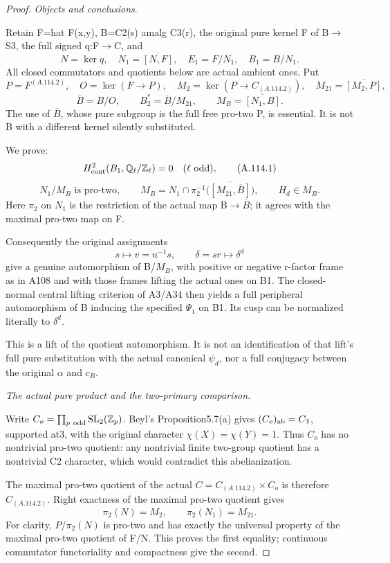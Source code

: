 \begin{proof}
\medskip\noindent\emph{Objects and conclusions}.

Retain F=hat F(x,y), B=C2(s) amalg C3(r), the original pure kernel F of B\(\to\)S3, the full signed q:F\(\to\)C, and
\[
N=\ker q,\quad N_1=\overline{[N,F]},\quad
E_1=F/N_1,\quad B_1=B/N_1.
\]
All closed commutators and quotients below are actual ambient ones. Put
\[
P=F^{(A.114.2)},\quad O=\ker(F\to P),\quad
M_2=\ker(P\to C_{(A.114.2)}),\quad M_{21}=\overline{[M_2,P]},
\]
\[
\overline B=B/O,\qquad B_2^*=\overline B/M_{21},\qquad
M_B=\overline{[N_1,B]}.
\]
The use of \(\overline B\), whose pure subgroup is the full free pro-two P, is essential. It is not B with a different kernel silently substituted.

We prove:
\[
H^2_{\rm cont}(B_1,\mathbb Q_\ell/\mathbb Z_\ell)=0
\quad(\ell\text{ odd}),                                      \tag{A.114.1}
\]
\[
N_1/M_B\text{ is pro-two},\qquad
M_B=N_1\cap\pi_2^{-1}\bigl(\overline{[M_{21},\overline B]}\bigr),
\qquad H_d\in M_B.                                            \tag{A.114.2}
\]
Here \(\pi_2\) on \(N_1\) is the restriction of the actual map B\(\to\)\(\overline B\); it agrees with the maximal pro-two map on F.

Consequently the original assignments
\[
s\mapsto v=u^{-1}s,\qquad \delta=sr\mapsto\delta^d
\]
give a genuine automorphism of B/\(M_B\), with positive or negative r-factor frame as in A108 and with those frames lifting the actual ones on B1. The closed-normal central lifting criterion of A3/A34 then yields a full peripheral automorphism of B inducing the specified \(\Psi_1\) on B1. Its cusp can be normalized literally to \(\delta^d\).

This is a lift of the quotient automorphism. It is not an identification of that lift's full pure substitution with the actual canonical \(\psi_d\), nor a full conjugacy between the original \(\alpha\) and \(c_B\).

\medskip\noindent\emph{The actual pure product and the two-primary comparison}.

Write \(C_o=\prod_{p\ {\rm odd}}\operatorname{SL}_2(\mathbb Z_p)\).
Beyl's Proposition5.7(a) gives \((C_o)_{\rm ab}=C_3\), supported at3, with the original character \(\chi(X)=\chi(Y)=1\). Thus \(C_o\) has no nontrivial pro-two quotient: any nontrivial finite two-group quotient has a nontrivial C2 character, which would contradict this abelianization.

The maximal pro-two quotient of the actual \(C=C_{(A.114.2)}\times C_o\) is therefore \(C_{(A.114.2)}\). Right exactness of the maximal pro-two quotient gives
\[
\pi_2(N)=M_2,\qquad \pi_2(N_1)=M_{21}.                         \tag{A.114.3}
\]
For clarity, \(P/\pi_2(N)\) is pro-two and has exactly the universal property of the maximal pro-two quotient of F/N. This proves the first equality; continuous commutator functoriality and compactness give the second.


\end{proof}

